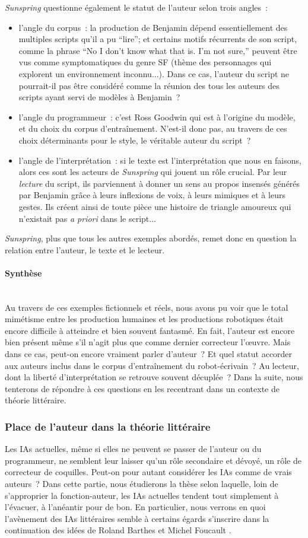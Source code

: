 \documentclass{article}
\newcommand{\subsubsubsection}[1]{\paragraph{#1}\mbox{}\\}
\begin{document}
					\textit{Sunspring} questionne également le statut de l'auteur selon trois angles~:
					\begin{itemize}
						\item l'angle du corpus~: la production de Benjamin dépend essentiellement des multiples scripts qu'il a pu ``lire''; et certains motifs récurrents de son script, comme la phrase ``No I don’t know what that is. I’m not sure,'' peuvent être vus comme symptomatiques du genre SF (thème des personnages qui explorent un environnement inconnu...). Dans ce cas, l'auteur du script ne pourrait-il pas être considéré comme la réunion des tous les auteurs des scripts ayant servi de modèles à Benjamin~?
						\item l'angle du programmeur~: c'est Ross Goodwin qui est à l'origine du modèle, et du choix du corpus d'entraînement. N'est-il donc pas, au travers de ces choix déterminants pour le style, le véritable auteur du script~?
						\item l'angle de l'interprétation~: si le texte est l'interprétation que nous en faisons, alors ces sont les acteurs de \textit{Sunspring} qui jouent un rôle crucial. Par leur \textit{lecture} du script, ils parviennent à donner un sens au propos insensés générés par Benjamin grâce à leurs inflexions de voix, à leurs mimiques et à leurs gestes. Ils créent ainsi de toute pièce une histoire de triangle amoureux qui n'existait pas \textit{a priori} dans le script...
					\end{itemize}
					\textit{Sunspring}, plus que tous les autres exemples abordés, remet donc en question la relation entre l'auteur, le texte et le lecteur.
				\subsubsubsection{Synthèse}
					Au travers de ces exemples fictionnels et réels, nous avons pu voir que le total mimétisme entre les production humaines et les productions robotiques était encore difficile à atteindre et bien souvent fantasmé. En fait, l'auteur est encore bien présent même s'il n'agit plus que comme dernier correcteur l'œuvre. Mais dans ce cas, peut-on encore vraiment parler d'auteur~? Et quel statut accorder aux auteurs inclus dans le corpus d'entraînement du robot-écrivain~? Au lecteur, dont la liberté d'interprétation se retrouve souvent décuplée~? Dans la suite, nous tenterons de répondre à ces questions en les recentrant dans un contexte de théorie littéraire.
			\subsubsection{Place de l'auteur dans la théorie littéraire}\label{place_auteur}
				Les IAs actuelles, même si elles ne peuvent se passer de l'auteur ou du programmeur, ne semblent leur laisser qu'un rôle secondaire et dévoyé, un rôle de correcteur de coquilles. Peut-on pour autant considérer les IAs comme de vrais auteurs~? Dans cette partie, nous étudierons la thèse selon laquelle, loin de s'approprier la fonction-auteur, les IAs actuelles tendent tout simplement à l'évacuer, à l'anéantir pour de bon. En particulier, nous verrons en quoi l'avènement des IAs littéraires semble à certains égards s'inscrire dans la continuation des idées de Roland Barthes \cite{barthes1968} et Michel Foucault \cite{foucault1969}.
				
\end{document}
